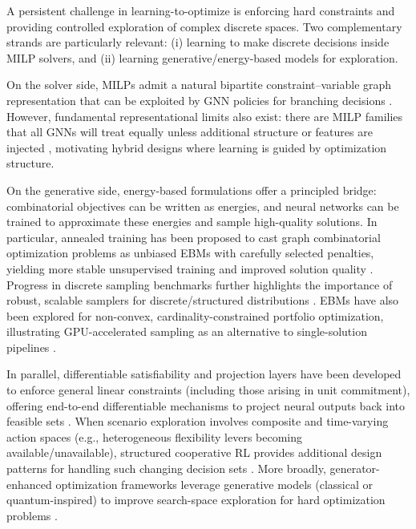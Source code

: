 \documentclass{article}
\let\parencite\citep
\begin{document}
A persistent challenge in learning-to-optimize is enforcing hard constraints and providing controlled exploration of complex discrete spaces. Two complementary strands are particularly relevant: (i) learning to make discrete decisions inside MILP solvers, and (ii) learning generative/energy-based models for exploration.

On the solver side, MILPs admit a natural bipartite constraint--variable graph representation that can be exploited by GNN policies for branching decisions \parencite{gasse_exact_2019}. However, fundamental representational limits also exist: there are MILP families that all GNNs will treat equally unless additional structure or features are injected \parencite{chen_representing_2023}, motivating hybrid designs where learning is guided by optimization structure.

On the generative side, energy-based formulations offer a principled bridge: combinatorial objectives can be written as energies, and neural networks can be trained to approximate these energies and sample high-quality solutions. In particular, annealed training has been proposed to cast graph combinatorial optimization problems as unbiased EBMs with carefully selected penalties, yielding more stable unsupervised training and improved solution quality \parencite{sun_annealed_2022}. Progress in discrete sampling benchmarks further highlights the importance of robust, scalable samplers for discrete/structured distributions \parencite{goshvadi_discs_2023}. EBMs have also been explored for non-convex, cardinality-constrained portfolio optimization, illustrating GPU-accelerated sampling as an alternative to single-solution pipelines \parencite{mancilla_non-convex_2026}.

In parallel, differentiable satisfiability and projection layers have been developed to enforce general linear constraints (including those arising in unit commitment), offering end-to-end differentiable mechanisms to project neural outputs back into feasible sets \parencite{zeng_glinsat_2024}. When scenario exploration involves composite and time-varying action spaces (e.g., heterogeneous flexibility levers becoming available/unavailable), structured cooperative RL provides additional design patterns for handling such changing decision sets \parencite{li_structured_2021}. More broadly, generator-enhanced optimization frameworks leverage generative models (classical or quantum-inspired) to improve search-space exploration for hard optimization problems \parencite{alcazar_enhancing_2024}.
\end{document}
